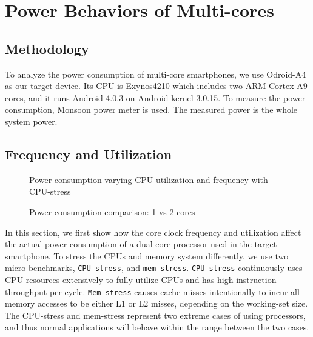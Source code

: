 \section{Power Behaviors of Multi-cores}

\subsection{Methodology}

To analyze the power consumption of multi-core smartphones, we use Odroid-A4 as our target device.
Its CPU is  Exynos4210 which includes two ARM Cortex-A9 cores, and
it runs Android 4.0.3 on Android kernel 3.0.15. To measure the power consumption, Monsoon power meter is used.
The measured power is the whole system power.

\subsection{Frequency and Utilization}

\begin{figure}[bt]
\begin{center}
\vspace{-0.2in}
\end{center}
\caption{Power consumption varying CPU utilization and frequency with CPU-stress}
\label{fig:util_power}
\end{figure}

\begin{figure}[bt]
\begin{center}
\vspace{-0.25in}
\end{center}
\caption{Power consumption comparison: 1 vs 2 cores}
\vspace{-0.2in}
\label{fig:1cpu_vs_2cpu}
\end{figure}

In this section, we first show how the core clock frequency and utilization affect the actual power
consumption of a dual-core processor used in the target smartphone. To stress the CPUs and memory system
differently, we use two micro-benchmarks, {\tt CPU-stress}, and {\tt mem-stress}. {\tt CPU-stress} 
continuously uses CPU resources extensively to fully utilize CPUs and has high instruction
throughput per cycle. {\tt Mem-stress} causes cache misses intentionally to incur all memory accesses
to be either L1 or L2 misses, depending on the working-set size. The CPU-stress and mem-stress represent two
extreme cases of using processors, and thus normal applications will behave within the range between 
the two cases.

